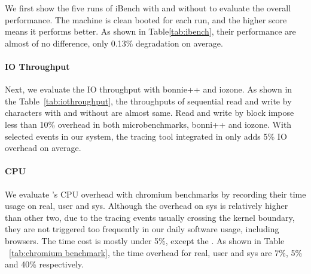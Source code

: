 We first show the five runs of iBench with and without \xxx to evaluate the
overall performance. The machine is clean booted for each run, and the higher
score means it performs better. As shown in Table\ref{tab:ibench}, their
performance are almost of no difference, only 0.13\% degradation on average.

\paragraph{IO Throughput}

Next, we evaluate the IO throughput with bonnie++ and iozone. As shown in the
Table~\ref{tab:iothroughput}, the throughputs of sequential read and write
by characters with and without \xxx are almost same. Read and write by block
impose less than 10\% overhead in  both microbenchmarks, bonni++ and iozone.
With selected events in our system, the tracing tool integrated in \xxx
only adds 5\% IO overhead on average.


\paragraph{CPU}

We evaluate \xxx's CPU overhead with chromium benchmarks by recording their
time usage on real, user and sys. Although the overhead on sys is relatively
higher than other two, due to the tracing events usually crossing the
kernel boundary, they are not triggered too frequently in our daily software
usage, including browsers. The time cost is mostly under 5\%, except the
. As shown in Table ~\ref{tab:chromium
benchmark}, the time overhead for real, user and sys are 7\%, 5\% and 40\%
respectively.
